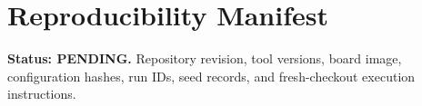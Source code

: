 \chapter{Reproducibility Manifest}
\textbf{Status: PENDING.} Repository revision, tool versions, board image, configuration
hashes, run IDs, seed records, and fresh-checkout execution instructions.
